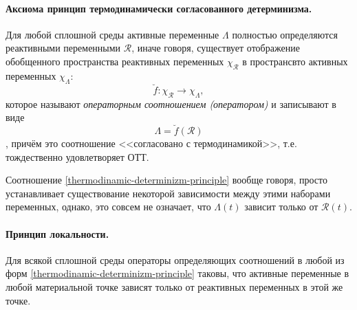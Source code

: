 
\paragraph{Аксиома принцип термодинамически согласованного детерминизма.}
Для любой сплошной среды активные переменные $\Lambda$ полностью определяются реактивными
переменными $\mathcal{R}$, иначе говоря, существует отображение обобщенного пространства
реактивных переменных $\chi_{\mathcal{R}}$ в пространсвто активных переменных $\chi_\Lambda$:
\begin{equation}
  \breve{f} : \chi_{\mathcal{R}} \to \chi_\Lambda,
\end{equation}
которое называют \emph{операторным соотношением (оператором)} и записывают в виде
\begin{equation}\label{thermodinamic-determinizm-principle}
  \Lambda = \breve{f} (\mathcal{R})
\end{equation}
, причём это соотношение <<согласовано с термодинамикой>>,
т.е. тождественно удовлетворяет ОТТ.

\begin{remark}
  Соотношение \eqref{thermodinamic-determinizm-principle} вообще говоря, просто
  устанавливает существование некоторой зависимости между этими наборами переменных, однако, это
  совсем не означает, что $\Lambda(t)$ зависит только от $\mathcal{R}(t)$.
\end{remark}

\paragraph{Принцип локальности.} Для всякой сплошной среды операторы
определяющих соотношений в любой из форм \eqref{thermodinamic-determinizm-principle} таковы, что
активные переменные в любой материальной точке зависят только от реактивных переменных в этой же
точке.
